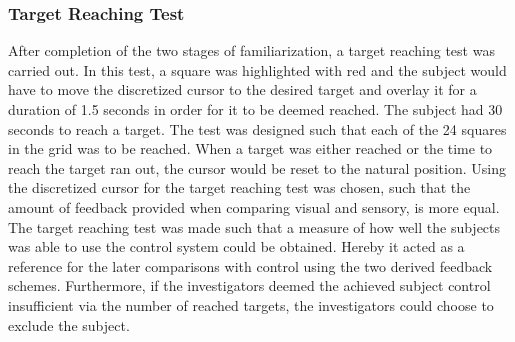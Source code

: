 \subsubsection{Target Reaching Test}

After completion of the two stages of familiarization, a target reaching test was carried out. In this test, a square was highlighted with red and the subject would have to move the discretized cursor to the desired target and overlay it for a duration of 1.5 seconds in order for it to be deemed reached. The subject had 30 seconds to reach a target. The test was designed such that each of the 24 squares in the grid was to be reached. When a target was either reached or the time to reach the target ran out, the cursor would be reset to the natural position. Using the discretized cursor for the target reaching test was chosen, such that the amount of feedback provided when comparing visual and sensory, is more equal.  \\
The target reaching test was made such that a measure of how well the subjects was able to use the control system could be obtained. Hereby it acted as a reference for the later comparisons with control using the two derived feedback schemes. Furthermore, if the investigators deemed the achieved subject control insufficient via the number of reached targets, the investigators could choose to exclude the subject.       













